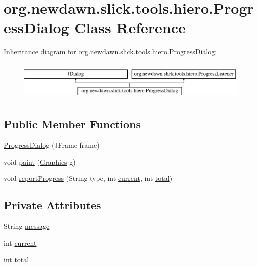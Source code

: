 \hypertarget{classorg_1_1newdawn_1_1slick_1_1tools_1_1hiero_1_1_progress_dialog}{}\section{org.\+newdawn.\+slick.\+tools.\+hiero.\+Progress\+Dialog Class Reference}
\label{classorg_1_1newdawn_1_1slick_1_1tools_1_1hiero_1_1_progress_dialog}
Inheritance diagram for org.\+newdawn.\+slick.\+tools.\+hiero.\+Progress\+Dialog\+:\begin{figure}[H]
\begin{center}
\leavevmode
\includegraphics[height=1.944445cm]{classorg_1_1newdawn_1_1slick_1_1tools_1_1hiero_1_1_progress_dialog}
\end{center}
\end{figure}
\subsection*{Public Member Functions}
\begin{DoxyCompactItemize}
\item 
\mbox{\hyperlink{classorg_1_1newdawn_1_1slick_1_1tools_1_1hiero_1_1_progress_dialog_a682daff052b72afb47eeb3daae24aaa6}{Progress\+Dialog}} (J\+Frame frame)
\item 
void \mbox{\hyperlink{classorg_1_1newdawn_1_1slick_1_1tools_1_1hiero_1_1_progress_dialog_ab20af450e284c7b3e838b45c40389ab0}{paint}} (\mbox{\hyperlink{classorg_1_1newdawn_1_1slick_1_1_graphics}{Graphics}} g)
\item 
void \mbox{\hyperlink{classorg_1_1newdawn_1_1slick_1_1tools_1_1hiero_1_1_progress_dialog_a4adf31baf5b6bd6056548bfa991aadb1}{report\+Progress}} (String type, int \mbox{\hyperlink{classorg_1_1newdawn_1_1slick_1_1tools_1_1hiero_1_1_progress_dialog_aba73b86e01e2e9a3cde55146ce905aa5}{current}}, int \mbox{\hyperlink{classorg_1_1newdawn_1_1slick_1_1tools_1_1hiero_1_1_progress_dialog_a7facb05047f254e898637bdfde4d3000}{total}})
\end{DoxyCompactItemize}
\subsection*{Private Attributes}
\begin{DoxyCompactItemize}
\item 
String \mbox{\hyperlink{classorg_1_1newdawn_1_1slick_1_1tools_1_1hiero_1_1_progress_dialog_acd9d79724bb00dac233a3fb61df9b3e8}{message}}
\item 
int \mbox{\hyperlink{classorg_1_1newdawn_1_1slick_1_1tools_1_1hiero_1_1_progress_dialog_aba73b86e01e2e9a3cde55146ce905aa5}{current}}
\item 
int \mbox{\hyperlink{classorg_1_1newdawn_1_1slick_1_1tools_1_1hiero_1_1_progress_dialog_a7facb05047f254e898637bdfde4d3000}{total}}
\end{DoxyCompactItemize}


